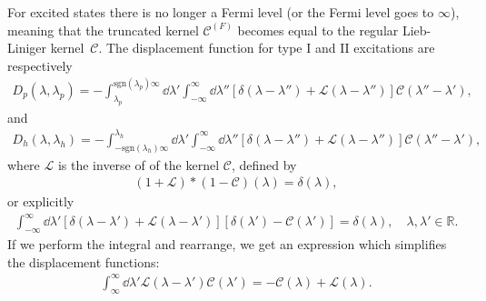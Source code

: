 \documentclass[11pt, a4paper]{report} %
\newcommand{\inversetruncc}{\mathcal{L}}
\newcommand{\kernel}{\mathcal{C}}
\begin{document}
For excited states there is no longer a Fermi level \cite{tofind} (or the Fermi level goes to \(\infty\)), meaning that the truncated kernel \(\kernel^{(F)}\) becomes equal to the regular Lieb-Liniger kernel~\(\kernel\).
The displacement function for type I and II excitations are respectively \cite{tofind}
\begin{align}
	D_p(\lambda, \lambda_p) = - \int_{\lambda_p}^{\textrm{sgn}(\lambda_p)\infty} \dd \lambda' \int_{-\infty}^{\infty} \dd  \lambda'' \left[\delta(\lambda-\lambda'') + \inversetruncc(\lambda-\lambda'') \right]\kernel(\lambda''-\lambda'),
\end{align}
and
\begin{align}
	D_h(\lambda, \lambda_h) = - \int_{-\textrm{sgn}(\lambda_h)\infty}^{\lambda_h} \dd \lambda' \int_{-\infty}^{\infty} \dd \lambda'' \left[\delta(\lambda-\lambda'') + \inversetruncc(\lambda - \lambda'') \right]\kernel(\lambda''-\lambda'),
\end{align}
where \(\inversetruncc\) is the inverse of of the kernel \(\kernel\), defined by \cite{tofind}
\begin{align}
	(1+\inversetruncc)*(1-\kernel)(\lambda) = \delta(\lambda),
\end{align}
or explicitly
\begin{align}
	\int_{-\infty}^{\infty} \dd \lambda' \left[ \delta(\lambda-\lambda') + \inversetruncc(\lambda-\lambda') \right] \left[ \delta(\lambda') - \kernel(\lambda')\right] = \delta(\lambda), \quad \lambda, \lambda' \in \mathbb{R}.
\end{align}
If we perform the integral and rearrange, we get an expression which simplifies the displacement functions:
\begin{align}\label{eq:kernelinversion}
	\int_{\infty}^{\infty} \dd \lambda' \inversetruncc(\lambda-\lambda') \kernel(\lambda') = -\kernel(\lambda) + \inversetruncc(\lambda).
\end{align}
\end{document}
